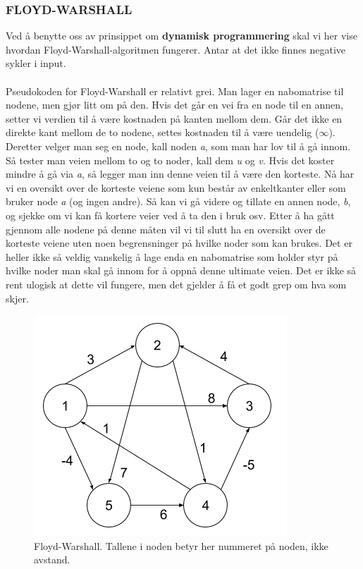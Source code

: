 \subsubsection{FLOYD-WARSHALL}
Ved å benytte oss av prinsippet om \textbf{dynamisk programmering} skal vi her vise hvordan Floyd-Warshall-algoritmen fungerer. Antar at det ikke finnes negative sykler i input.
\\\\
Pseudokoden for Floyd-Warshall er relativt grei. Man lager en nabomatrise til nodene, men gjør litt om på den. Hvis det går en vei fra en node til en annen, setter vi verdien til å være kostnaden på kanten mellom dem. Går det ikke en direkte kant mellom de to nodene, settes kostnaden til å være uendelig ($\infty$). Deretter velger man seg en node, kall noden \textit{a}, som man har lov til å gå innom. Så tester man veien mellom to og to noder, kall dem \textit{u} og \textit{v}. Hvis det koster mindre å gå via \textit{a}, så legger man inn denne veien til å være den korteste. Nå har vi en oversikt over de korteste veiene som kun består av enkeltkanter eller som bruker node \textit{a} (og ingen andre). Så kan vi gå videre og tillate en annen node, \textit{b}, og sjekke om vi kan få kortere veier ved å ta den i bruk osv. Etter å ha gått gjennom alle nodene på denne måten vil vi til slutt ha en oversikt over de korteste veiene uten noen begrensninger på hvilke noder som kan brukes. Det er heller ikke så veldig vanskelig å lage enda en nabomatrise som holder styr på hvilke noder man skal gå innom for å oppnå denne ultimate veien. Det er ikke så rent ulogisk at dette vil fungere, men det gjelder å få et godt grep om hva som skjer.

\begin{figure}[H]
\includegraphics[scale=0.5]{images/floyd-warshall}
\centering %
\caption{Floyd-Warshall. Tallene i noden betyr her nummeret på noden, ikke avstand.}
\label{fig:floyd-warshall}
\end{figure}

